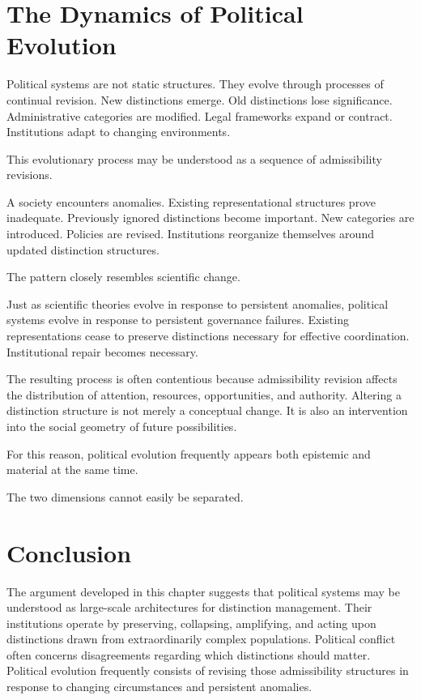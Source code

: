 \documentclass[11pt,oneside,openany]{book}
\begin{document}
\section{The Dynamics of Political Evolution}

Political systems are not static structures. They evolve through processes of continual revision. New distinctions emerge. Old distinctions lose significance. Administrative categories are modified. Legal frameworks expand or contract. Institutions adapt to changing environments.

This evolutionary process may be understood as a sequence of admissibility revisions.

A society encounters anomalies. Existing representational structures prove inadequate. Previously ignored distinctions become important. New categories are introduced. Policies are revised. Institutions reorganize themselves around updated distinction structures.

The pattern closely resembles scientific change.

Just as scientific theories evolve in response to persistent anomalies, political systems evolve in response to persistent governance failures. Existing representations cease to preserve distinctions necessary for effective coordination. Institutional repair becomes necessary.

The resulting process is often contentious because admissibility revision affects the distribution of attention, resources, opportunities, and authority. Altering a distinction structure is not merely a conceptual change. It is also an intervention into the social geometry of future possibilities.

For this reason, political evolution frequently appears both epistemic and material at the same time.

The two dimensions cannot easily be separated.

\section{Conclusion}

The argument developed in this chapter suggests that political systems may be understood as large-scale architectures for distinction management. Their institutions operate by preserving, collapsing, amplifying, and acting upon distinctions drawn from extraordinarily complex populations. Political conflict often concerns disagreements regarding which distinctions should matter. Political evolution frequently consists of revising those admissibility structures in response to changing circumstances and persistent anomalies.
\end{document}
